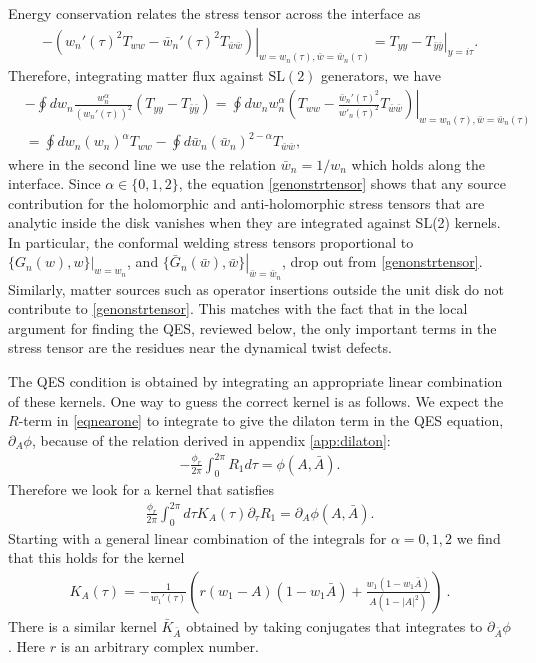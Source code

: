 \documentclass[11pt,oneside,letterpaper]{article}
\newcommand{\p}{\partial}
\newcommand{\f}{\frac}
\let\l=\lambda \let\m=\mu \let\n=\nu \let\x=\xi \let\p=\phi \let\r=v
\let\y=\psi
\let\f=\frac
\let\pa=\partial
\def\ba{\begin{eqnarray}}
\def\ea{\end{eqnarray}}
\renewcommand{\p}{\partial}
\numberwithin{equation}{section}
\def\m{{\mu}}
\def\n{{\nu}}
\def\p{{\phi}}
\def\ba{\begin{eqnarray}}
\def\ea{\end{eqnarray}}
\def\r{\rightarrow}
\def\f {\frac}
\def\l{\left}
\def\r{\right}
\def \bA {\bar{A}}
\def\y{\bar{y}}
\def\x{\bar{x}}
\renewcommand{\p}{\partial}
\begin{document}
\begin{spacing}{1.1}
Energy conservation relates the stress tensor across the interface as 
\ba\label{energyconservation}
\l. -\l( w_n'(\tau)^2 T_{ w w } -\bar{w}_n'(\tau)^2 T_{\bar{w} \bar{w}} \r)  \r|_{ w = w_n(\tau), \bar{w} = \bar{w}_n(\tau)} =  \l. {T}_{y y} - {T}_{\y \y}  \r|_{y= i\tau}.
\ea
Therefore, integrating  matter flux against $\text{SL}(2)$ generators, we have
\begin{align} \label{genonstrtensor}
&-\oint dw_n \frac{w_n^\alpha}{(w_n'(\tau))^2}  \l( {T}_{y y} - {T}_{\y \y}  \r) =  \l. \oint dw_n w_n^\alpha \l( T_{ww } - \f{\bar{w}_n'(\tau)^2}{w'_n(\tau)^2}T_{\bar{w}\bar{w}} \r)\r|_{ w = w_n(\tau), \bar{w} = \bar{w}_n(\tau)} \nonumber\\
& = \oint dw_n (w_n)^\alpha  T_{ww } - \oint d\bar{w}_n (\bar{w}_n)^{2-\alpha} T_{\bar{w} \bar{w}},
\end{align}
where in the second line we use the relation $\bar{w}_n = 1/w_{n}$ which holds along the interface.
 Since $\alpha \in \{0,1,2\}$, the equation \eqref{genonstrtensor} shows that any source contribution for the holomorphic and anti-holomorphic stress tensors that are analytic inside the disk vanishes when they are integrated against SL(2) kernels. In particular, the conformal welding stress tensors proportional to $\l. \{ G_n(w) , w\} \r|_{w=w_n}$, and $\l. \{ \bar{G}_n(\bar{w}) , \bar{w}\} \r|_{\bar{w}=\bar{w}_n}$, drop out from \eqref{genonstrtensor}. Similarly, matter sources such as operator insertions outside the unit disk do not contribute to \eqref{genonstrtensor}. This matches with the fact that in the local argument for finding the QES, reviewed below, the only important terms in the stress tensor are the residues near the dynamical twist defects.

The QES condition is obtained by integrating an appropriate linear combination of these kernels. One way to guess the correct kernel is as follows. We expect the $R$-term in \eqref{eqnearone} to integrate to give the dilaton term in the QES equation, $\p_A \phi$, because of the relation derived in appendix \ref{app:dilaton}:
\ba\label{dilatonintermR}
-\frac{\phi_r}{2\pi} \int_0^{2\pi} R_1 d\tau = \phi(A,\bA).
\ea
Therefore we look for a kernel that satisfies
\ba \label{kerdilaton}
\f{\phi_r}{2\pi}  \int_0^{2\pi} d\tau K_{A}(\tau) \pa_\tau R_1 = \pa_A \phi(A,\bA).
\ea
Starting with a general linear combination of the integrals for $\alpha= 0,1,2$ we find that this holds for the kernel
\ba \label{kernel}
K_A( \tau) = - \frac{1}{ w_1'(\tau)} \l( r (w_1-A)(1- w_1 \bA) + \frac{w_1 (1-w_1 \bA)}{A (1-|A|^2)}  \r) \ .
\ea
There is a similar kernel $\bar{K}_{\bar{A}}$ obtained by taking conjugates that integrates to $\p_{\bar{A}}\phi$. Here $r$ is an arbitrary complex number.


\end{spacing}
\end{document}

